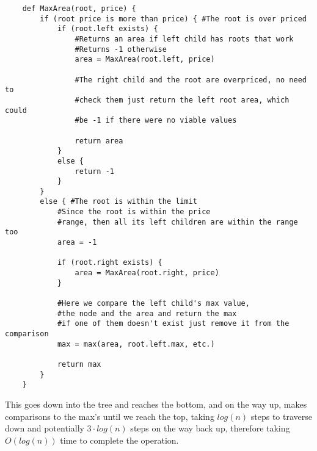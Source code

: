 \documentclass[20pt]{article}
\begin{document}
\begin{lstlisting}
    def MaxArea(root, price) {
        if (root price is more than price) { #The root is over priced
            if (root.left exists) {
                #Returns an area if left child has roots that work
                #Returns -1 otherwise
                area = MaxArea(root.left, price)
                
                #The right child and the root are overpriced, no need to
                #check them just return the left root area, which could
                #be -1 if there were no viable values
    
                return area
            }
            else {
                return -1
            }
        }
        else { #The root is within the limit
            #Since the root is within the price
            #range, then all its left children are within the range too
            area = -1
            
            if (root.right exists) {
                area = MaxArea(root.right, price)
            }
            
            #Here we compare the left child's max value, 
            #the node and the area and return the max
            #if one of them doesn't exist just remove it from the comparison
            max = max(area, root.left.max, etc.)
            
            return max
        }
    }
\end{lstlisting}
\noindent
\begin{text}
    This goes down into the tree and reaches the bottom, and on the way up, makes comparisons to the max's until we reach the top, taking $log(n)$ steps to traverse down and potentially $3\cdot log(n)$ steps on the way back up, therefore taking $O(log(n))$ time to complete the operation.
\end{text}


\newpage

\end{document}
